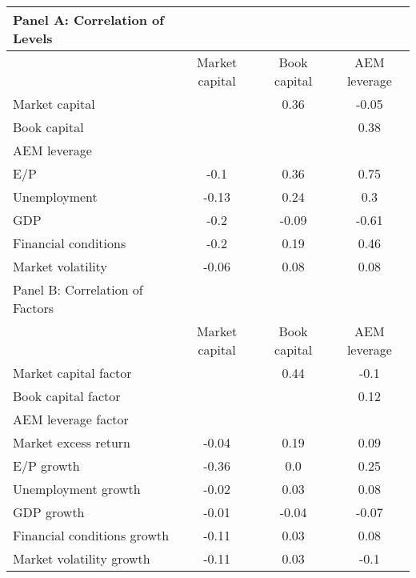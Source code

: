 
    \begin{table}[htbp]
    \centering
    \begin{adjustbox}{max width=\textwidth}
    \small
    \begin{tabular}{lccc}
        \toprule
        Panel A: Correlation of Levels \\
        \midrule
         & Market capital & Book capital & AEM leverage \\
        \midrule
        Market capital &  & 0.36 & -0.05 \\
Book capital &  &  & 0.38 \\
AEM leverage &  &  &  \\
E/P & -0.1 & 0.36 & 0.75 \\
Unemployment & -0.13 & 0.24 & 0.3 \\
GDP & -0.2 & -0.09 & -0.61 \\
Financial conditions & -0.2 & 0.19 & 0.46 \\
Market volatility & -0.06 & 0.08 & 0.08 \\
        \midrule
        Panel B: Correlation of Factors \\
        \midrule
         & Market capital & Book capital & AEM leverage \\
        \midrule
        Market capital factor &  & 0.44 & -0.1 \\
Book capital factor &  &  & 0.12 \\
AEM leverage factor &  &  &  \\
Market excess return & -0.04 & 0.19 & 0.09 \\
E/P growth & -0.36 & 0.0 & 0.25 \\
Unemployment growth & -0.02 & 0.03 & 0.08 \\
GDP growth & -0.01 & -0.04 & -0.07 \\
Financial conditions growth & -0.11 & 0.03 & 0.08 \\
Market volatility growth & -0.11 & 0.03 & -0.1 \\
        \bottomrule
    \end{tabular}
    \end{adjustbox}
    \end{table}
    